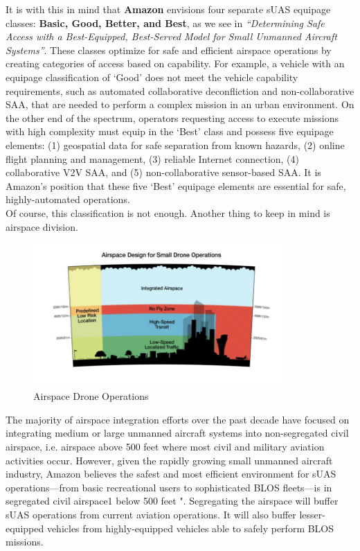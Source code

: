 \documentclass[conference]{IEEEtran}
\begin{document}
It is with this in mind that \textbf{Amazon} envisions four separate sUAS equipage classes: \textbf{Basic, Good, Better, and Best}, as we see in \textit{``Determining Safe Access with a Best-Equipped, Best-Served Model for Small Unmanned Aircraft Systems''}. These classes optimize for safe and efficient airspace operations by creating categories of access based on capability. For example, a vehicle with an equipage classification of ‘Good’ does not meet the vehicle capability requirements, such as automated collaborative deconfliction and non-collaborative SAA, that are needed to perform a complex mission in an urban environment. On the other end of the spectrum, operators requesting access to execute missions with high complexity must equip in the `Best' class and possess five equipage elements: (1) geospatial data for safe separation from known hazards, (2) online flight planning and management, (3) reliable Internet connection, (4) collaborative V2V SAA, and (5) non-collaborative sensor-based SAA. It is Amazon's position that these five `Best' equipage elements are essential for safe, highly-automated operations.\\

Of course, this classification is not enough. Another thing to keep in mind is airspace division.

\begin{figure}[!t]
\centering
\includegraphics[width=0.85\textwidth]{airspace-design-small-drone-operations}
\caption{Airspace Drone Operations}
\label{fig_airspace_drone_operations}
\end{figure}

The majority of airspace integration efforts over the past decade have focused on integrating medium or large unmanned aircraft systems into non-segregated civil airspace, i.e. airspace above 500 feet where most civil and military aviation activities occur. However, given the rapidly growing small unmanned aircraft industry, Amazon believes the safest and most efficient environment for sUAS operations—from basic recreational users to sophisticated BLOS fleets—is in segregated civil airspace1 below 500 feet ". Segregating the airspace will buffer sUAS operations from current aviation operations. It will also buffer lesser-equipped vehicles from highly-equipped vehicles able to safely perform BLOS missions.\\
\end{document}
